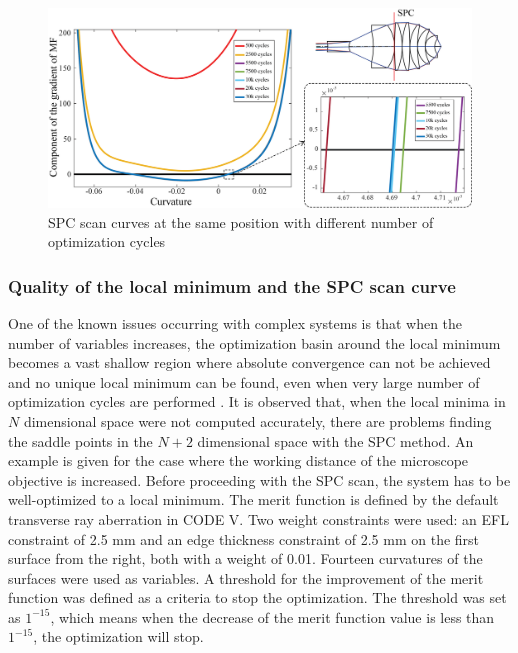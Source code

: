 \begin{figure}[h!]
    \centering
    \includegraphics[width=\textwidth]{chapter-4/figures/vollrath_optcyc.png}
    \caption{SPC scan curves at the same position with different number of optimization cycles}
    \label{fig: vollrath_optcyc}
\end{figure}

\subsubsection{Quality of the local minimum and the SPC scan curve}
One of the known issues occurring with complex systems is that when the number of variables increases, the optimization basin around the local minimum becomes a vast shallow region where absolute convergence can not be achieved and no unique local minimum can be found, even when very large number of optimization cycles are performed \cite{Brixner81}. It is observed that, when the local minima in $N$ dimensional space were not computed accurately, there are problems finding the saddle points in the $N+2$ dimensional space with the SPC method. An example is given for the case where the working distance of the microscope objective is increased. Before proceeding with the SPC scan, the system has to be well-optimized to a local minimum. The merit function is defined by the default transverse ray aberration in CODE V. Two weight constraints were used: an EFL constraint of 2.5 mm and an edge thickness constraint of 2.5 mm on the first surface from the right, both with a weight of 0.01. Fourteen curvatures of the surfaces were used as variables. A threshold for the improvement of the merit function was defined as a criteria to stop the optimization. The threshold was set as $1^{-15}$, which means when the decrease of the merit function value is less than $1^{-15}$, the optimization will stop. 
 
